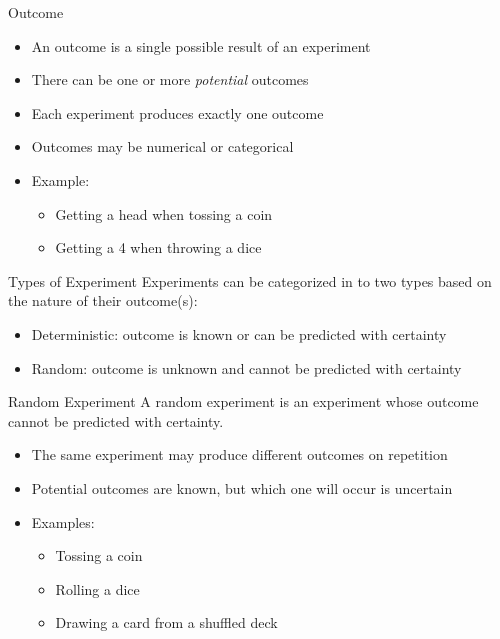 \documentclass[12pt, aspectratio=169]{beamer}
\begin{document}
	\begin{frame}{Outcome}
		\begin{itemize}
			\item An outcome is a single possible result of an experiment
			\item There can be one or more \emph{potential} outcomes
			\item Each experiment produces exactly one outcome
			\item Outcomes may be numerical or categorical
			\item Example:
			\begin{itemize}
				\item Getting a head when tossing a coin
				\item Getting a 4 when throwing a dice
			\end{itemize}
		\end{itemize}		
	\end{frame}


	\begin{frame}{Types of Experiment}
		Experiments can be categorized in to two types based on the nature of their outcome(s):
		\begin{itemize}
			\item Deterministic: outcome is known or can be predicted with certainty
			\item Random: outcome is unknown and cannot be predicted with certainty
		\end{itemize}
	\end{frame}


	\begin{frame}{Random Experiment}
	A random experiment is an experiment whose outcome cannot be predicted with certainty.
		\begin{itemize}
			\item The same experiment may produce different outcomes on repetition
			\item Potential outcomes are known, but which one will occur is uncertain
			\item Examples:
			\begin{itemize}
				\item Tossing a coin
				\item Rolling a dice
				\item Drawing a card from a shuffled deck
			\end{itemize}
		\end{itemize}
	\end{frame}
\end{document}
